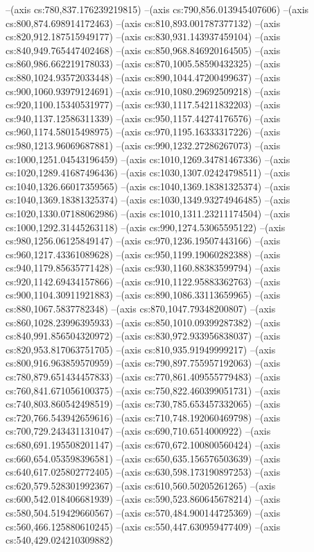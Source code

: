 --(axis cs:780,837.176239219815)
--(axis cs:790,856.013945407606)
--(axis cs:800,874.698914172463)
--(axis cs:810,893.001787377132)
--(axis cs:820,912.187515949177)
--(axis cs:830,931.143937459104)
--(axis cs:840,949.765447402468)
--(axis cs:850,968.846920164505)
--(axis cs:860,986.662219178033)
--(axis cs:870,1005.58590432325)
--(axis cs:880,1024.93572033448)
--(axis cs:890,1044.47200499637)
--(axis cs:900,1060.93979124691)
--(axis cs:910,1080.29692509218)
--(axis cs:920,1100.15340531977)
--(axis cs:930,1117.54211832203)
--(axis cs:940,1137.12586311339)
--(axis cs:950,1157.44274176576)
--(axis cs:960,1174.58015498975)
--(axis cs:970,1195.16333317226)
--(axis cs:980,1213.96069687881)
--(axis cs:990,1232.27286267073)
--(axis cs:1000,1251.04543196459)
--(axis cs:1010,1269.34781467336)
--(axis cs:1020,1289.41687496436)
--(axis cs:1030,1307.02424798511)
--(axis cs:1040,1326.66017359565)
--(axis cs:1040,1369.18381325374)
--(axis cs:1040,1369.18381325374)
--(axis cs:1030,1349.93274946485)
--(axis cs:1020,1330.07188062986)
--(axis cs:1010,1311.23211174504)
--(axis cs:1000,1292.31445263118)
--(axis cs:990,1274.53065595122)
--(axis cs:980,1256.06125849147)
--(axis cs:970,1236.19507443166)
--(axis cs:960,1217.43361089628)
--(axis cs:950,1199.19060282388)
--(axis cs:940,1179.85635771428)
--(axis cs:930,1160.88383599794)
--(axis cs:920,1142.69434157866)
--(axis cs:910,1122.95883362763)
--(axis cs:900,1104.30911921883)
--(axis cs:890,1086.33113659965)
--(axis cs:880,1067.5837782348)
--(axis cs:870,1047.79348200807)
--(axis cs:860,1028.23996395933)
--(axis cs:850,1010.09399287382)
--(axis cs:840,991.856504320972)
--(axis cs:830,972.933956838037)
--(axis cs:820,953.817063751705)
--(axis cs:810,935.91949999217)
--(axis cs:800,916.963859570959)
--(axis cs:790,897.755957192063)
--(axis cs:780,879.651434457833)
--(axis cs:770,861.409555779483)
--(axis cs:760,841.671056100375)
--(axis cs:750,822.460399051731)
--(axis cs:740,803.860542498519)
--(axis cs:730,785.653457332065)
--(axis cs:720,766.543942659616)
--(axis cs:710,748.192060469798)
--(axis cs:700,729.243431131047)
--(axis cs:690,710.6514000922)
--(axis cs:680,691.195508201147)
--(axis cs:670,672.100800560424)
--(axis cs:660,654.053598396581)
--(axis cs:650,635.156576503639)
--(axis cs:640,617.025802772405)
--(axis cs:630,598.173190897253)
--(axis cs:620,579.528301992367)
--(axis cs:610,560.50205261265)
--(axis cs:600,542.018406681939)
--(axis cs:590,523.860645678214)
--(axis cs:580,504.519429660567)
--(axis cs:570,484.900144725369)
--(axis cs:560,466.125880610245)
--(axis cs:550,447.630959477409)
--(axis cs:540,429.024210309882)
